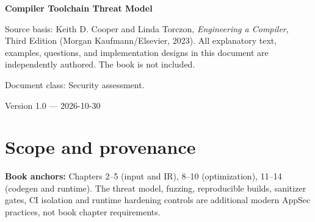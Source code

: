 \documentclass[10pt,letterpaper]{article}
\begin{document}
\begin{titlepage}
\centering\vspace*{1.0in}
{\Huge\bfseries\textcolor{CompilerBlue}{Compiler Toolchain Threat Model}\par}
\vspace{.22in}{\Large Pipeline assets and trust boundaries\par}
\vspace{.4in}{\large Compiler Engineering Documentation Suite\par}
\vfill
\begin{minipage}{.86\linewidth}\small
Source basis: Keith D. Cooper and Linda Torczon, \emph{Engineering a Compiler}, Third Edition (Morgan Kaufmann/Elsevier, 2023). All explanatory text, examples, questions, and implementation designs in this document are independently authored. The book is not included.\par\medskip
Document class: Security assessment.
\end{minipage}
\vfill\textcolor{CompilerGray}{Version 1.0 --- 2026-10-30}\par
\end{titlepage}
\tableofcontents\clearpage
\section{Scope and provenance}
\textbf{Book anchors:} Chapters 2--5 (input and IR), 8--10 (optimization), 11--14 (codegen and runtime). \modern The threat model, fuzzing, reproducible builds, sanitizer gates, CI isolation and runtime hardening controls are additional modern AppSec practices, not book chapter requirements.\par
\end{document}
